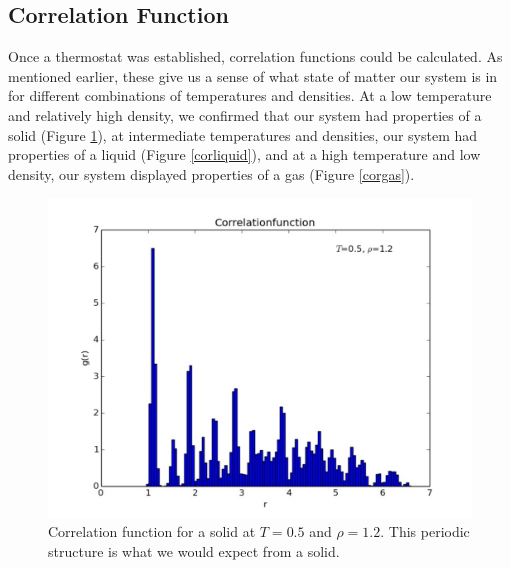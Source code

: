 \documentclass{article}
\begin{document}
\begin{multicols}{2}
\subsection{Correlation Function}

Once a thermostat was established, correlation functions could be calculated.  As mentioned earlier, these give us a sense of what state of matter our system is in for different combinations of temperatures and densities.  At a low temperature and relatively high density, we confirmed that our system had properties of a solid (Figure \ref{corsolid}), at intermediate temperatures and densities, our system had properties of a liquid (Figure \ref{corliquid}), and at a high temperature and low density, our system displayed properties of a gas (Figure \ref{corgas}).  

\begin{figure}[H]
\begin{center}
\includegraphics[width=\linewidth]{plots/correlationfunctionT05rho12x.pdf}
\caption{Correlation function for a solid at $T=0.5$ and $\rho=1.2$.  This periodic structure is what we would expect from a solid.}
\label{corsolid}
\end{center}
\end{figure}


\end{multicols}
\end{document}
